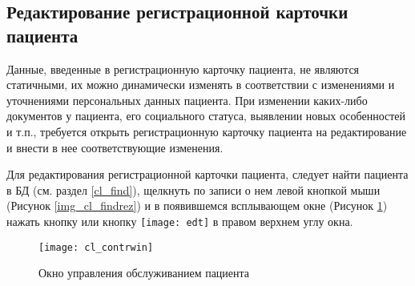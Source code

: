 {\subsection{Редактирование регистрационной карточки пациента}

Данные, введенные в регистрационную карточку пациента, не являются статичными, их можно динамически изменять в соответствии с изменениями и уточнениями персональных данных пациента. При изменении каких-либо документов у пациента, его социального статуса, выявлении новых особенностей и т.п., требуется открыть регистрационную карточку пациента на редактирование и внести в нее соответствующие изменения. 

Для редактирования регистрационной карточки пациента, следует найти пациента в БД (см. раздел \ref{cl_find}), щелкнуть по записи о нем левой кнопкой мыши (Рисунок \ref{img_cl_findrez}) и в появившемся всплывающем окне (Рисунок \ref{img_cl_contrwin}) нажать кнопку  или кнопку \texttt{[image: edt]} в правом верхнем углу окна. 
}{}

\begin{figure}[ht]\centering
 \texttt{[image: cl\_contrwin]}
 \caption{Окно управления обслуживанием пациента}
 \label{img_cl_contrwin}
\end{figure} 

